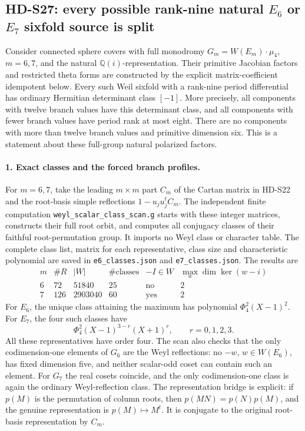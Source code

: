 \subsection{HD-S27: every possible rank-nine natural \(E_6\) or \(E_7\) sixfold source is split}
\label{sec:e6-e7-split}

Consider connected sphere covers with full monodromy
\(G_m=W(E_m)\cdot\mu_4\), \(m=6,7\), and the natural
\(\mathbb Q(i)\)-representation. Their primitive Jacobian factors
and restricted theta forms are constructed by the explicit
matrix-coefficient idempotent below. Every such Weil sixfold with
a rank-nine period differential has ordinary Hermitian determinant
class \([-1]\). More precisely, all components with twelve branch
values have this determinant class, and all components with fewer
branch values have period rank at most eight. There are no components
with more than twelve branch values and primitive dimension six.
This is a statement about these full-group natural polarized factors.

\paragraph{1. Exact classes and the forced branch profiles.}
For \(m=6,7\), take the leading \(m\times m\) part \(C_m\)
of the Cartan matrix in HD-S22 and the root-basis simple reflections
\(1-u_ju_j^tC_m\). The independent finite computation
\texttt{weyl\_scalar\_class\_scan.g} starts with these integer
matrices, constructs their full root orbit, and computes all conjugacy
classes of their faithful root-permutation group. It imports no Weyl
class or character table. The complete class list, matrix for each
representative, class size and characteristic polynomial are saved
in \texttt{e6\_classes.json} and \texttt{e7\_classes.json}.
The results are
\[
\begin{array}{c|r|r|r|c|c}
 m&\#R&|W|&\#\text{classes}&-I\in W&
       \max_w\dim\ker(w-i)\\\hline
 6&72&51840&25&\text{no}&2\\
 7&126&2903040&60&\text{yes}&2
\end{array}
\]
For \(E_6\), the unique class attaining the maximum has polynomial
\(\Phi_4^2(X-1)^2\). For \(E_7\), the four such classes have
\[
 \Phi_4^2(X-1)^{3-r}(X+1)^r,\qquad r=0,1,2,3.
\]
All these representatives have order four. The scan also checks that
the only codimension-one elements of \(G_6\) are the Weyl
reflections: no \(-w\), \(w\in W(E_6)\), has fixed dimension
five, and neither scalar-odd coset can contain such an element.
For \(G_7\) the real cosets coincide, and the only codimension-one
class is again the ordinary Weyl-reflection class. The representation
bridge is explicit: if \(p(M)\) is the permutation of column roots,
then \(p(MN)=p(N)p(M)\), and the genuine representation is
\(p(M)\mapsto M^t\). It is conjugate to the original root-basis
representation by \(C_m\).

